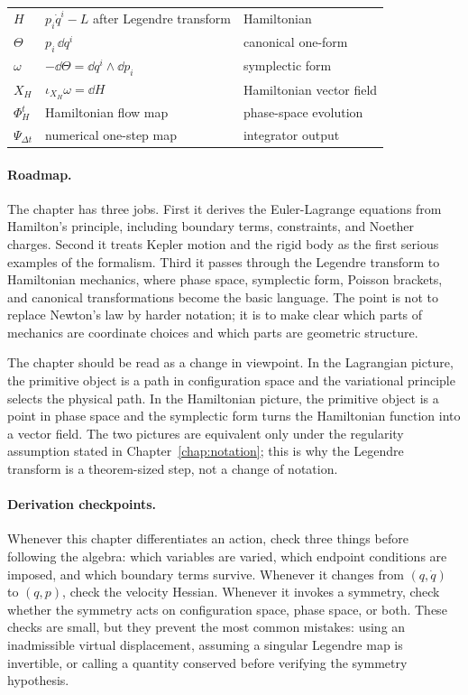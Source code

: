 \begin{table}[htbp]
\begin{tabular}{p{}p{}p{}}
\(H\) & \(p_i\dot q^i-L\) after Legendre transform & Hamiltonian\\
\(\Theta\) & \(p_i\,\dd q^i\) & canonical one-form\\
\(\omega\) & \(-\dd\Theta=\dd q^i\wedge\dd p_i\) & symplectic form\\
\(X_H\) & \(\iota_{X_H}\omega=\dd H\) & Hamiltonian vector field\\
\(\Phi_H^t\) & Hamiltonian flow map & phase-space evolution\\
\(\Psi_{\Delta t}\) & numerical one-step map & integrator output\\
\bottomrule
\end{tabular}
\end{table}

\paragraph{Roadmap.}
The chapter has three jobs. First it derives the Euler-Lagrange equations from
Hamilton's principle, including boundary terms, constraints, and Noether
charges. Second it treats Kepler motion and the rigid body as the first serious
examples of the formalism. Third it passes through the Legendre transform to
Hamiltonian mechanics, where phase space, symplectic form, Poisson brackets,
and canonical transformations become the basic language. The point is not to
replace Newton's law by harder notation; it is to make clear which parts of
mechanics are coordinate choices and which parts are geometric structure.

The chapter should be read as a change in viewpoint. In the Lagrangian picture,
the primitive object is a path in configuration space and the variational
principle selects the physical path. In the Hamiltonian picture, the primitive
object is a point in phase space and the symplectic form turns the Hamiltonian
function into a vector field. The two pictures are equivalent only under the
regularity assumption stated in Chapter~\ref{chap:notation}; this is why the
Legendre transform is a theorem-sized step, not a change of notation.

\paragraph{Derivation checkpoints.}
Whenever this chapter differentiates an action, check three things before
following the algebra: which variables are varied, which endpoint conditions
are imposed, and which boundary terms survive. Whenever it changes from
\((q,\dot q)\) to \((q,p)\), check the velocity Hessian. Whenever it invokes a
symmetry, check whether the symmetry acts on configuration space, phase space,
or both. These checks are small, but they prevent the most common mistakes:
using an inadmissible virtual displacement, assuming a singular Legendre map is
invertible, or calling a quantity conserved before verifying the symmetry
hypothesis.

